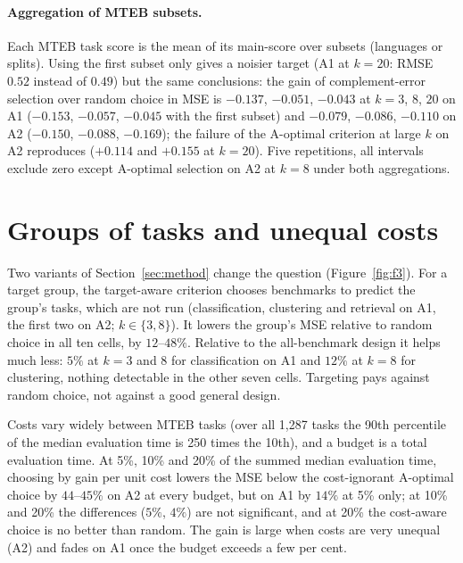 \begin{table}[h]
\centering\scriptsize\setlength{\tabcolsep}{3pt}

\caption{Primary comparisons on the generative-LLM matrices: relative change in held-out MSE (\%), first named minus second; 95\% bootstrap intervals over held-out models (each averaged over five repetitions), family-held-out folds; bold: Holm-adjusted $p<0.05$ within each matrix's family, whose size is in the block header; the budgets $k$ of the three columns are in each block's header; kNN and softImpute were not run on the 40-subtask matrix.}
\label{tab:t3}
\end{table}

\paragraph{Aggregation of MTEB subsets.}
Each MTEB task score is the mean of its main-score over subsets (languages or splits).
Using the first subset only gives a noisier target (A1 at $k=20$: RMSE $0.52$ instead of $0.49$) but the same conclusions: the gain of complement-error selection over random choice in MSE is $-0.137$, $-0.051$, $-0.043$ at $k=3$, $8$, $20$ on A1 ($-0.153$, $-0.057$, $-0.045$ with the first subset) and $-0.079$, $-0.086$, $-0.110$ on A2 ($-0.150$, $-0.088$, $-0.169$); the failure of the A-optimal criterion at large $k$ on A2 reproduces ($+0.114$ and $+0.155$ at $k=20$).
Five repetitions, all intervals exclude zero except A-optimal selection on A2 at $k=8$ under both aggregations.

\section{Groups of tasks and unequal costs}
\label{app:groups}
Two variants of Section~\ref{sec:method} change the question (Figure~\ref{fig:f3}).
For a target group, the target-aware criterion chooses benchmarks to predict the group's tasks, which are not run (classification, clustering and retrieval on A1, the first two on A2; $k\in\{3,8\}$).
It lowers the group's MSE relative to random choice in all ten cells, by $12$--$48\%$.
Relative to the all-benchmark design it helps much less: $5\%$ at $k=3$ and $8$ for classification on A1 and $12\%$ at $k=8$ for clustering, nothing detectable in the other seven cells.
Targeting pays against random choice, not against a good general design.

Costs vary widely between MTEB tasks (over all 1,287 tasks the 90th percentile of the median evaluation time is 250 times the 10th), and a budget is a total evaluation time.
At 5\%, 10\% and 20\% of the summed median evaluation time, choosing by gain per unit cost lowers the MSE below the cost-ignorant A-optimal choice by $44$--$45\%$ on A2 at every budget, but on A1 by $14\%$ at 5\% only; at 10\% and 20\% the differences ($5\%$, $4\%$) are not significant, and at 20\% the cost-aware choice is no better than random.
The gain is large when costs are very unequal (A2) and fades on A1 once the budget exceeds a few per cent.

